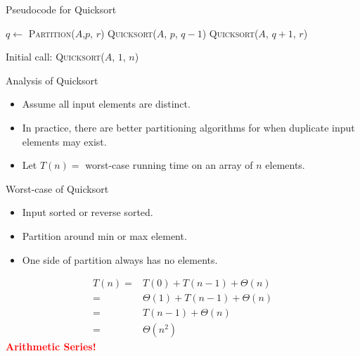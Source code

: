 \documentclass{beamer}
\begin{document}
\begin{frame}{Pseudocode for Quicksort}
        \begin{algorithm}[H]
            \begin{algorithmic}[1]
                        \State $q \leftarrow$ \textsc{Partition}($A$,$p$, $r$)
                        \State \textsc{Quicksort}($A$, $p$, $q - 1$)
                        \State \textsc{Quicksort}($A$, $q + 1$, $r$)
                    \EndIf
                \EndProcedure
            \end{algorithmic}
        \end{algorithm}
        \begin{alertblock}{Initial call:}
            \textsc{Quicksort}($A$, $1$, $n$)
        \end{alertblock}
\end{frame}

\begin{frame}{Analysis of Quicksort}
    \begin{itemize}
        \item Assume all input elements are distinct.
        \item In practice, there are better partitioning algorithms for when duplicate input elements may exist.
        \item Let $T(n) =$ worst-case running time on an array of $n$ elements.
    \end{itemize}
\end{frame}

\begin{frame}{Worst-case of Quicksort}
    \begin{itemize}
        \item Input sorted or reverse sorted.
        \item Partition around min or max element.
        \item One side of partition always has no elements.
    \end{itemize}
    \begin{equation*}
        \begin{split}
            T(n) =& T(0) + T(n - 1) + \Theta(n) \\
                    =& \Theta(1) + T(n - 1) + \Theta(n) \\
                    =& T(n - 1) + \Theta(n) \\
                    =& \Theta(n^2)
        \end{split}
    \end{equation*}
    \pause
    \centering
    \textcolor{red}{\textbf{Arithmetic Series!}}
\end{frame}
\end{document}
